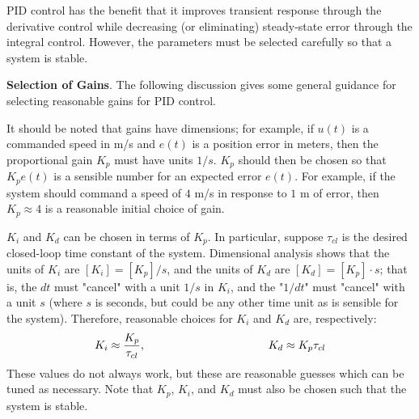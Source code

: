 PID control has the benefit that it improves transient response through the derivative control while decreasing (or eliminating) steady-state error through the integral control. However, the parameters must be selected carefully so that a system is stable.

\begin{framed}
    \textbf{Selection of Gains}. The following discussion gives some general guidance for selecting reasonable gains for PID control.

    It should be noted that gains have dimensions; for example, if $u(t)$ is a commanded speed in m/s and $e(t)$ is a position error in meters, then the proportional gain $K_p$ must have units $1/s$. $K_p$ should then be chosen so that $K_p e(t)$ is a sensible number for an expected error $e(t)$. For example, if the system should command a speed of $4$ m/s in response to $1$ m of error, then $K_p\approx 4$ is a reasonable initial choice of gain.

    $K_i$ and $K_d$ can be chosen in terms of $K_p$. In particular, suppose $\tau_{cl}$ is the desired closed-loop time constant of the system. Dimensional analysis shows that the units of $K_i$ are $[K_i] = [K_p]/s$, and the units of $K_d$ are $[K_d] = [K_p]\cdot s$; that is, the $dt$ must "cancel" with a unit $1/s$ in $K_i$, and the "$1/dt$" must "cancel" with a unit $s$ (where $s$ is seconds, but could be any other time unit as is sensible for the system). Therefore, reasonable choices for $K_i$ and $K_d$ are, respectively: \[K_i \approx \frac{K_p}{\tau_{cl}},\hspace{1.5in} K_d \approx K_p \tau_{cl}\] These values do not always work, but these are reasonable guesses which can be tuned as necessary. Note that $K_p$, $K_i$, and $K_d$ must also be chosen such that the system is stable.


\end{framed}
